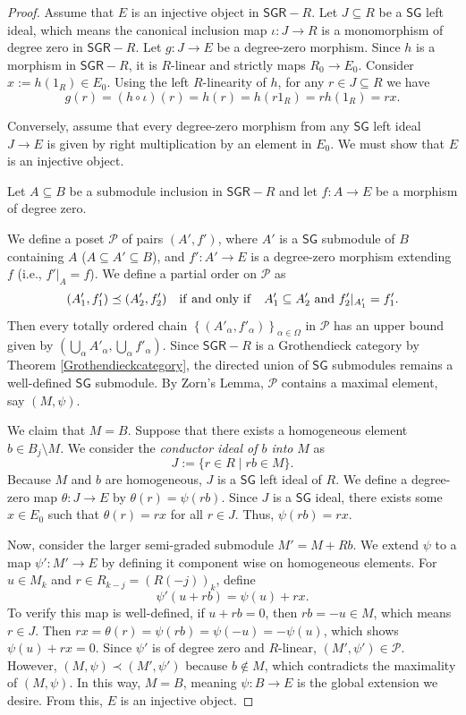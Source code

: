 \documentclass[reqno]{amsart}
\theoremstyle{definition}
\theoremstyle{remark}
\numberwithin{equation}{section}
\begin{document}
\begin{proof}
Assume that $E$ is an injective object in $\mathsf{SGR}-R$. Let $J \subseteq R$ be a $\mathsf{SG}$ left ideal, which means the canonical inclusion map $\iota: J \to R$ is a monomorphism of degree zero in $\mathsf{SGR}-R$. Let $g: J \to E$ be a degree-zero morphism. Since $h$ is a morphism in $\mathsf{SGR}-R$, it is $R$-linear and strictly maps $R_0 \to E_0$. Consider $x := h(1_R) \in E_0$. Using the left $R$-linearity of $h$, for any $r \in J \subseteq R$ we have 
\[
g(r) = (h \circ \iota)(r) = h(r) = h(r 1_R) = r h(1_R) = r x.
\]

Conversely, assume that every degree-zero morphism from any $\mathsf{SG}$ left ideal \linebreak $J \to E$ is given by right multiplication by an element in $E_0$. We must show that $E$ is an injective object. 

Let $A \subseteq B$ be a submodule inclusion in $\mathsf{SGR}-R$ and let $f: A \to E$ be a morphism of degree zero. 

We define a poset $\mathcal{P}$ of pairs $(A', f')$, where $A'$ is a $\mathsf{SG}$ submodule of $B$ containing $A$ ($A \subseteq A' \subseteq B$), and $f': A' \to E$ is a degree-zero morphism extending $f$ (i.e., $f'|_{A} = f$). We define a partial order on $\mathcal{P}$ as 
\[
(A'_1, f'_1) \preceq (A'_2, f'_2) \quad {\rm if \ and \ only \ if} \quad A'_1 \subseteq A'_2 \text{ and } f'_2|_{A'_1} = f'_1.
\]
Then every totally ordered chain $\left\{(A'_\alpha, f'_\alpha)\right\}_{\alpha \in \Omega}$ in $\mathcal{P}$ has an upper bound given by $\left(\bigcup_\alpha A'_\alpha, \bigcup_\alpha f'_\alpha\right)$. Since $\mathsf{SGR}-R$ is a Grothendieck category by Theorem \ref{Grothendieckcategory}, the directed union of $\mathsf{SG}$ submodules remains a well-defined $\mathsf{SG}$ submodule. By Zorn's Lemma, $\mathcal{P}$ contains a maximal element, say $(M, \psi)$. 

We claim that $M = B$. Suppose that there exists a homogeneous element $b \in B_j \setminus M$. We consider the {\em conductor ideal of $b$ into} $M$ as
\[
J := \{ r \in R \mid r b \in M \}.
\]
Because $M$ and $b$ are homogeneous, $J$ is a $\mathsf{SG}$ left ideal of $R$. We define a degree-zero map $\theta: J \to E$ by $\theta(r) = \psi(r b)$. Since $J$ is a $\mathsf{SG}$ ideal, there exists some $x \in E_0$ such that $\theta(r) = r x$ for all $r \in J$. Thus, $\psi(r b) = r x$.

Now, consider the larger semi-graded submodule $M' = M + R b$. We extend $\psi$ to a map $\psi': M' \to E$ by defining it component wise on homogeneous elements. For $u \in M_k$ and $r \in R_{k-j} = (R(-j))_k$, define 
\[
\psi'(u + r b) = \psi(u) + r x.
\]
To verify this map is well-defined, if $u + r b = 0$, then $r b = -u \in M$, which means $r \in J$. Then $r x = \theta(r) = \psi(r b) = \psi(-u) = -\psi(u)$, which shows $\psi(u) + r x = 0$. Since $\psi'$ is of degree zero and $R$-linear, $(M', \psi') \in \mathcal{P}$. However, $(M, \psi) \prec (M', \psi')$ because $b \notin M$, which contradicts the maximality of $(M, \psi)$. In this way, $M = B$, meaning $\psi: B \to E$ is the global extension we desire. From this, $E$ is an injective object.
\end{proof}
\end{document}
